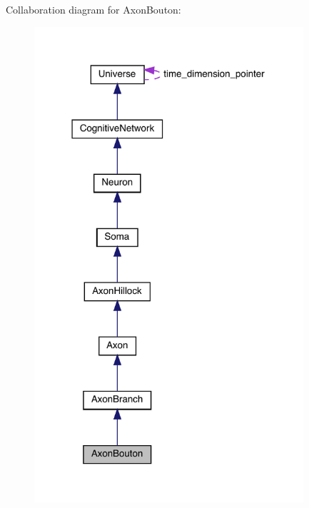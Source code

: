 Collaboration diagram for Axon\+Bouton\+:
\nopagebreak
\begin{figure}[H]
\begin{center}
\leavevmode
\includegraphics[width=283pt]{class_axon_bouton__coll__graph}
\end{center}
\end{figure}
